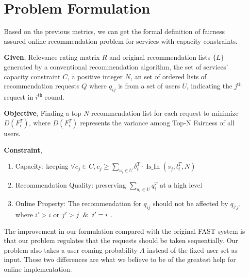 \section{Problem Formulation}

Based on the previous metrics, we can get the formal definition of fairness assured online recommendation problem for services with capacity constraints.

\begin{definition}

\textbf{Given}, Relevance rating matrix $R$ and original recommendation lists $\{L\}$ generated by a conventional recommendation algorithm, the set of services' capacity constraint $C$, a positive integer $N$, an set of ordered lists of recommendation requests $Q$ where $q_{ij}$ is from a set of users $U$, indicating the $j^{\text{th}}$ request in $i^{\text{th}}$ round. 


\textbf{Objective}, Finding a top-$N$ recommendation list for each request to minimize $D(F_i^T)$, where $D\left(F_{i}^{T}\right)$ represents the variance among Top-N Fairness of all users.

\textbf{Constraint},
\begin{enumerate}\setlength{\itemsep}{-0.1cm}
    \item Capacity: keeping $\forall c_{j} \in C, c_{j} \geqslant \sum_{u_{i} \in U} \delta_{i}^{T} \cdot  \operatorname{Is\_In}\left(s_{j}, l_{i}^{T}, N\right)$
    \item Recommendation Quality: preserving $\sum_{u_{i} \in U} q_{i}^{T}$ at a high level
    \item Online Property: The recommendation for $q_{ij}$ should not be affected by $q_{i'j'}$ where $ i' > i$ or  $j'> j \And i' = i$ .
\end{enumerate}

\end{definition}

The improvement in our formulation compared with the original FAST system is that our problem regulates that the requests should be taken sequentially. Our problem also takes a user coming probability $A$ instead of the fixed user set as input. These two differences are what we believe to be of the greatest help for online implementation.
